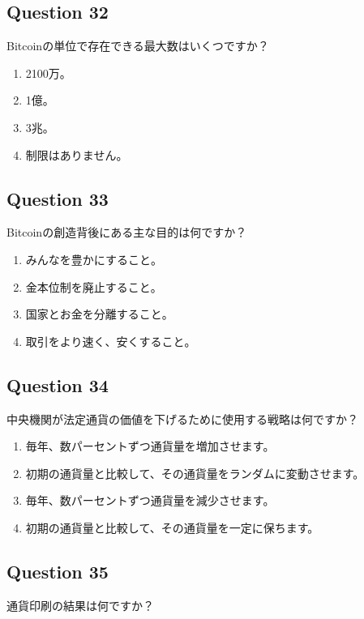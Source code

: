 \documentclass[12pt,a4paper]{article}
\begin{document}
\subsection*{Question 32}
Bitcoinの単位で存在できる最大数はいくつですか？

\begin{enumerate}[label=\Alph*., leftmargin=*]
\item 2100万。
\item 1億。
\item 3兆。
\item 制限はありません。
\end{enumerate}

\bigskip


\subsection*{Question 33}
Bitcoinの創造背後にある主な目的は何ですか？

\begin{enumerate}[label=\Alph*., leftmargin=*]
\item みんなを豊かにすること。
\item 金本位制を廃止すること。
\item 国家とお金を分離すること。
\item 取引をより速く、安くすること。
\end{enumerate}

\bigskip


\subsection*{Question 34}
中央機関が法定通貨の価値を下げるために使用する戦略は何ですか？

\begin{enumerate}[label=\Alph*., leftmargin=*]
\item 毎年、数パーセントずつ通貨量を増加させます。
\item 初期の通貨量と比較して、その通貨量をランダムに変動させます。
\item 毎年、数パーセントずつ通貨量を減少させます。
\item 初期の通貨量と比較して、その通貨量を一定に保ちます。
\end{enumerate}

\bigskip


\subsection*{Question 35}
通貨印刷の結果は何ですか？
\end{document}
